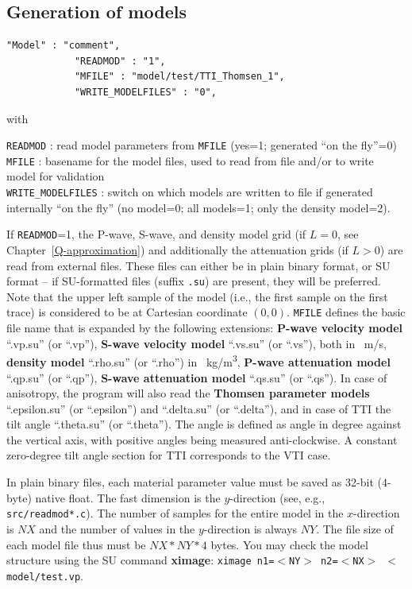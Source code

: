 \subsection{Generation of models}
\label{gen_of_mod}
\begin{verbatim}
"Model" : "comment",
            "READMOD" : "1",
            "MFILE" : "model/test/TTI_Thomsen_1",
            "WRITE_MODELFILES" : "0",
\end{verbatim}

with

\texttt{READMOD} : read model parameters from \texttt{MFILE} (yes=1; generated \enquote{on the fly}=0)\\
\texttt{MFILE} : basename for the model files, used to read from file and/or to write model for validation\\
\texttt{WRITE\_MODELFILES} : switch on which models are written to file if generated internally \enquote{on the fly} (no model=0; all models=1; only the density model=2).

If \texttt{READMOD}=1, the P-wave, S-wave, and density model grid (if $L=0$, see Chapter~\ref{Q-approximation}) and additionally the attenuation grids (if $L>0$) are read from external files. These files can either be in plain binary format, or SU format -- if SU-formatted files (suffix \texttt{.su}) are present, they will be preferred. Note that the upper left sample of the model (i.e., the first sample on the first trace) is considered to be at Cartesian coordinate $(0,0)$. \texttt{MFILE} defines the basic file name that is expanded by the following extensions: \textbf{P-wave velocity model} \enquote{.vp.su} (or \enquote{.vp}), \textbf{S-wave velocity model} \enquote{.vs.su} (or \enquote{.vs}), both in \SI{}{m/s}, \textbf{density model} \enquote{.rho.su} (or \enquote{.rho}) in \SI{}{kg/m^3}, \textbf{P-wave attenuation model} \enquote{.qp.su} (or \enquote{.qp}), \textbf{S-wave attenuation model} \enquote{.qs.su} (or \enquote{.qs}). In case of anisotropy, the program will also read the \textbf{Thomsen parameter models} \enquote{.epsilon.su} (or \enquote{.epsilon}) and \enquote{.delta.su} (or \enquote{.delta}), and in case of TTI the tilt angle \enquote{.theta.su} (or \enquote{.theta}). The angle is defined as angle in degree against the vertical axis, with positive angles being measured anti-clockwise. A constant zero-degree tilt angle section for TTI corresponds to the VTI case.

In plain binary files, each material parameter value must be saved as 32-bit (4-byte) native float. The fast dimension is the $y$-direction (see, e.g., \texttt{src/readmod*.c}). The number of samples for the entire model in the $x$-direction is $NX$ and the number of values in the $y$-direction is always $NY$. The file size of each model file thus must be $NX*NY*4$ bytes. You may check the model structure using the SU command \textbf{ximage}: \texttt{ximage n1=$<$NY$>$ n2=$<$NX$>$ $<$ model/test.vp}.

